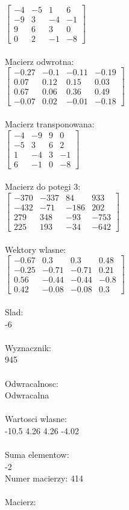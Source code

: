\documentclass[a4paper,12pt]{article}
\begin{document}
$\begin{bmatrix} -4&-5&1&6\\-9&3&-4&-1\\9&6&3&0\\0&2&-1&-8 \end{bmatrix}$
\\
\\
Macierz odwrotna:\\

$\begin{bmatrix} -0.27&-0.1&-0.11&-0.19\\0.07&0.12&0.15&0.03\\0.67&0.06&0.36&0.49\\-0.07&0.02&-0.01&-0.18 \end{bmatrix}$
\\
\\
Macierz transponowana:\\

$\begin{bmatrix} -4&-9&9&0\\-5&3&6&2\\1&-4&3&-1\\6&-1&0&-8 \end{bmatrix}$
\\
\\
Macierz do potegi 3:\\

$\begin{bmatrix} -370&-337&84&933\\-432&-71&-186&202\\279&348&-93&-753\\225&193&-34&-642 \end{bmatrix}$
\\
\\
Wektory wlasne:\\

$\begin{bmatrix} -0.67&0.3&0.3&0.48\\-0.25&-0.71&-0.71&0.21\\0.56&-0.44&-0.44&-0.8\\0.42&-0.08&-0.08&0.3 \end{bmatrix}$
\\
\\
Slad:\\
-6
\\
\\
Wyznacznik:\\
945
\\
\\
Odwracalnosc:\\
Odwracalna
\\
\\
Wartosci wlasne:\\
-10.5 4.26 4.26 -4.02
\\
\\
Suma elementow:\\
-2
\\
\newpage
Numer macierzy:
414
\\
\\
Macierz:\\
\end{document}
